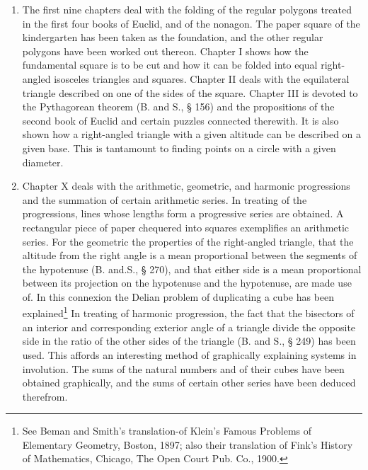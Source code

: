 \begin{enumerate}
    \item The first nine chapters deal with the folding of the regular polygons
        treated in the first four books of Euclid, and of the nonagon.  The
        paper square of the kindergarten has been taken as the foundation, and
        the other regular polygons have been worked out thereon.  Chapter I
        shows how the fundamental square is to be cut and how it can be folded
        into equal right-angled isosceles triangles and squares.  Chapter II
        deals with the equilateral triangle described on one of the sides of the
        square.  Chapter III is devoted to the Pythagorean theorem (B. and S., §
        156) and the propositions of the second book of Euclid and certain
        puzzles connected therewith.  It is also shown how a right-angled
        triangle with a given altitude can be described on a given base.  This
        is tantamount to finding points on a circle with a given diameter.

    \item Chapter X deals with the arithmetic, geometric, and harmonic
        progressions and the summation of certain arithmetic series.  In
        treating of the progressions, lines whose lengths form a progressive
        series are obtained.  A rectangular piece of paper chequered into
        squares exemplifies an arithmetic series.  For the geometric the
        properties of the right-angled triangle, that the altitude from the
        right angle is a mean proportional between the segments of the
        hypotenuse (B. and.S., § 270), and that either side is a mean
        proportional between its projection on the hypotenuse and the
        hypotenuse, are made use of. In this connexion the Delian problem of
        duplicating a cube has been explained\footnote{See Beman and Smith’s
        translation-of Klein's Famous Problems of Elementary Geometry, Boston,
        1897; also their translation of Fink’s History of Mathematics, Chicago,
        The Open Court Pub. Co., 1900.}  In treating of harmonic progression,
        the fact that the bisectors of an interior and corresponding exterior
        angle of a triangle divide the opposite side in the ratio of the other
        sides of the triangle (B.  and S., § 249) has been used.  This affords
        an interesting method of graphically explaining systems in involution.
        The sums of the natural numbers and of their cubes have been obtained
        graphically, and the sums of certain other series have been deduced
        therefrom.


\end{enumerate}
